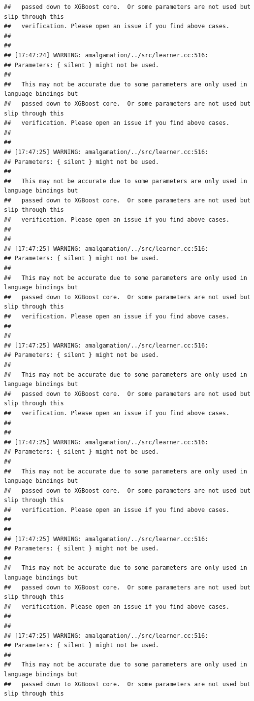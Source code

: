 \documentclass[AMS,STIX2COL]{WileyNJD-v2}\usepackage[]{graphicx}\usepackage[]{color}
\makeatletter
\newenvironment{kframe}{%
 \def\at@end@of@kframe{}%
 \ifinner\ifhmode%
  \def\at@end@of@kframe{\end{minipage}}%
  \begin{minipage}{\columnwidth}%
 \fi\fi%
 \def\FrameCommand##1{\hskip\@totalleftmargin \hskip-\fboxsep
 \colorbox{shadecolor}{##1}\hskip-\fboxsep
     \hskip-\linewidth \hskip-\@totalleftmargin \hskip\columnwidth}%
 \MakeFramed {\advance\hsize-\width
   \@totalleftmargin\z@ \linewidth\hsize
   \@setminipage}}%
 {\par\unskip\endMakeFramed%
 \at@end@of@kframe}
\newenvironment{knitrout}{}{} %
\makeatother
\begin{document}
\begin{knitrout}
\begin{kframe}
\begin{verbatim}
##   passed down to XGBoost core.  Or some parameters are not used but slip through this
##   verification. Please open an issue if you find above cases.
## 
## 
## [17:47:24] WARNING: amalgamation/../src/learner.cc:516: 
## Parameters: { silent } might not be used.
## 
##   This may not be accurate due to some parameters are only used in language bindings but
##   passed down to XGBoost core.  Or some parameters are not used but slip through this
##   verification. Please open an issue if you find above cases.
## 
## 
## [17:47:25] WARNING: amalgamation/../src/learner.cc:516: 
## Parameters: { silent } might not be used.
## 
##   This may not be accurate due to some parameters are only used in language bindings but
##   passed down to XGBoost core.  Or some parameters are not used but slip through this
##   verification. Please open an issue if you find above cases.
## 
## 
## [17:47:25] WARNING: amalgamation/../src/learner.cc:516: 
## Parameters: { silent } might not be used.
## 
##   This may not be accurate due to some parameters are only used in language bindings but
##   passed down to XGBoost core.  Or some parameters are not used but slip through this
##   verification. Please open an issue if you find above cases.
## 
## 
## [17:47:25] WARNING: amalgamation/../src/learner.cc:516: 
## Parameters: { silent } might not be used.
## 
##   This may not be accurate due to some parameters are only used in language bindings but
##   passed down to XGBoost core.  Or some parameters are not used but slip through this
##   verification. Please open an issue if you find above cases.
## 
## 
## [17:47:25] WARNING: amalgamation/../src/learner.cc:516: 
## Parameters: { silent } might not be used.
## 
##   This may not be accurate due to some parameters are only used in language bindings but
##   passed down to XGBoost core.  Or some parameters are not used but slip through this
##   verification. Please open an issue if you find above cases.
## 
## 
## [17:47:25] WARNING: amalgamation/../src/learner.cc:516: 
## Parameters: { silent } might not be used.
## 
##   This may not be accurate due to some parameters are only used in language bindings but
##   passed down to XGBoost core.  Or some parameters are not used but slip through this
##   verification. Please open an issue if you find above cases.
## 
## 
## [17:47:25] WARNING: amalgamation/../src/learner.cc:516: 
## Parameters: { silent } might not be used.
## 
##   This may not be accurate due to some parameters are only used in language bindings but
##   passed down to XGBoost core.  Or some parameters are not used but slip through this

\end{verbatim}
\end{kframe}
\end{knitrout}
\end{document}
